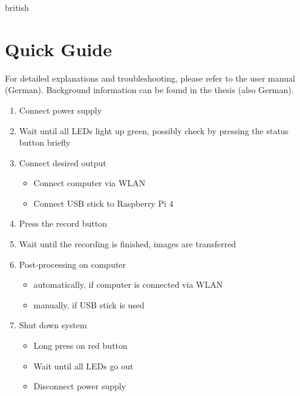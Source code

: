 \documentclass[./00PhotoBox.tex]{subfiles}
\begin{document}
\begin{otherlanguage*}{british}

    \chapter{Quick Guide}

    For detailed explanations and troubleshooting, please refer to the user manual (German). Background information can be found in the thesis (also German).

    \begin{enumerate}
        \item Connect power supply
        \item Wait until all LEDs light up green, possibly check by pressing the status button briefly
        \item Connect desired output
              \begin{itemize}
                  \item Connect computer via WLAN
                  \item Connect USB stick to Raspberry Pi 4
              \end{itemize}
        \item Press the record button
        \item Wait until the recording is finished, images are transferred
        \item Post-processing on computer
              \begin{itemize}
                  \item automatically, if computer is connected via WLAN
                  \item manually, if USB stick is used
              \end{itemize}
        \item Shut down system
              \begin{itemize}
                  \item Long press on red button
                  \item Wait until all LEDs go out
                  \item Disconnect power supply
              \end{itemize}
    \end{enumerate}


\end{otherlanguage*}
\end{document}
